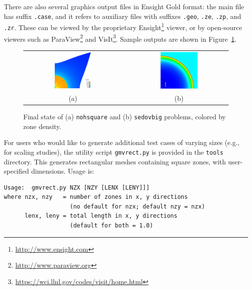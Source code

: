 \documentclass[11pt,letterpaper]{article} %
\begin{document}
There are also several graphics output files in Ensight Gold format:
the main file has suffix {\tt.case}, and it refers to auxiliary files
with suffixes {\tt.geo}, {\tt.ze}, {\tt.zp}, and {\tt.zr}.  These
can be viewed by the proprietary
Ensight\footnote{\url{http://www.ensight.com}}
viewer, or by open-source viewers such as
ParaView\footnote{\url{http://www.paraview.org}} and
VisIt\footnote{\url{https://wci.llnl.gov/codes/visit/home.html}}.
Sample outputs are shown in Figure~\ref{fig:output}.
\begin{figure}
    \centering
    \begin{tabular}{ccc}
    \includegraphics[width=0.40\textwidth]{noh-result.png} &
    \hspace{0.06\textwidth} &
    \includegraphics[width=0.40\textwidth]{sedov-result.png} \\
    (a) && (b) \\
    \end{tabular}
    \caption{Final state of (a) {\tt nohsquare} and (b) {\tt sedovbig}
    problems, colored by zone density.}
    \label{fig:output}
\end{figure}

For users who would like to generate additional test cases of varying
sizes (e.g., for scaling studies), the utility script {\tt gmvrect.py}
is provided in the {\tt tools} directory.  This generates rectangular
meshes containing square zones, with user-specified dimensions.
Usage is:
\begin{verbatim}
Usage:  gmvrect.py NZX [NZY [LENX [LENY]]]
where nzx, nzy   = number of zones in x, y directions
                   (no default for nzx; default nzy = nzx)
      lenx, leny = total length in x, y directions
                   (default for both = 1.0)
\end{verbatim}
\end{document}

